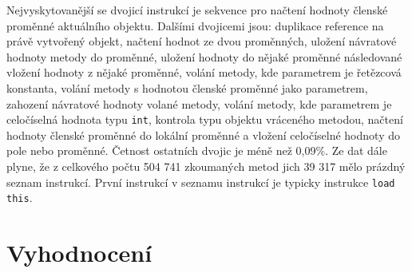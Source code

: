 
Nejvyskytovanější se dvojicí instrukcí je sekvence pro načtení hodnoty členské proměnné aktuálního objektu. Dalšími dvojicemi jsou: duplikace reference na právě vytvořený objekt, načtení hodnot ze dvou proměnných, uložení návratové hodnoty metody do proměnné, uložení hodnoty do nějaké proměnné následované vložení hodnoty z nějaké proměnné, volání metody, kde parametrem je řetězcová konstanta, volání metody s hodnotou členské proměnné jako parametrem, zahození návratové hodnoty volané metody, volání metody, kde parametrem je celočíselná hodnota typu \texttt{int}, kontrola typu objektu vráceného metodou, načtení hodnoty členské proměnné do lokální proměnné a vložení celočíselné hodnoty do pole nebo proměnné. Četnost ostatních dvojic je méně než 0,09\%. Ze dat dále plyne, že z celkového počtu 504 741 zkoumaných metod jich 39 317 mělo prázdný seznam instrukcí. První instrukcí v seznamu instrukcí je typicky instrukce \texttt{load this}.






\section{Vyhodnocení}\label{AnalysisSummary}
